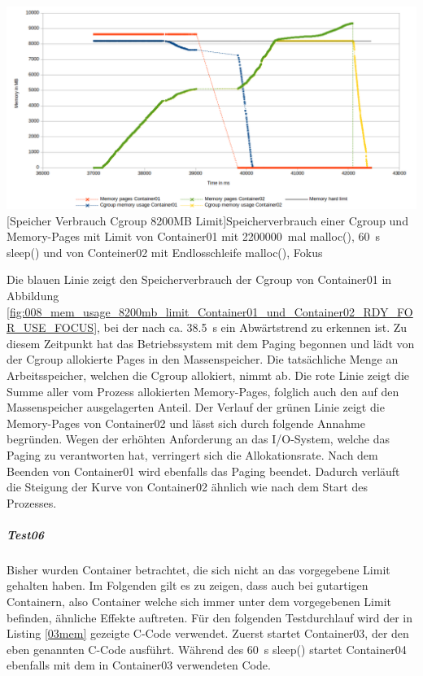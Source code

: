 \vspace{1em}
\begin{minipage}{\linewidth}
	\centering
	\includegraphics[width=1\linewidth]{pics/008_mem_usage_8200mb_limit_Container01_und_Container02_RDY_FOR_USE_FOCUS.png}
	[Speicher Verbrauch Cgroup 8200MB Limit]{Speicherverbrauch einer Cgroup und Memory-Pages mit Limit von Container01 mit \SI{2200000}{mal} malloc(), \SI{60}{\second} sleep() und von Conteiner02 mit Endlosschleife malloc(), Fokus}
	\label{fig:008_mem_usage_8200mb_limit_Container01_und_Container02_RDY_FOR_USE_FOCUS}
\end{minipage}



Die blauen Linie zeigt den Speicherverbrauch der Cgroup von Container01 in Abbildung \ref{fig:008_mem_usage_8200mb_limit_Container01_und_Container02_RDY_FOR_USE_FOCUS}, bei der nach ca. \SI{38,5}{\second} ein Abwärtstrend zu erkennen ist. Zu diesem Zeitpunkt hat das Betriebssystem mit dem Paging begonnen und lädt von der Cgroup allokierte Pages in den Massenspeicher. Die tatsächliche Menge an Arbeitsspeicher, welchen die Cgroup allokiert, nimmt ab. Die rote Linie zeigt die Summe aller vom Prozess allokierten Memory-Pages, folglich auch den auf den Massenspeicher ausgelagerten Anteil. Der Verlauf der grünen Linie zeigt die Memory-Pages von Container02 und lässt sich durch folgende Annahme begründen. Wegen der erhöhten Anforderung an das I/O-System, welche das Paging zu verantworten hat, verringert sich die Allokationsrate. Nach dem Beenden von Container01 wird ebenfalls das Paging beendet. Dadurch verläuft die Steigung der Kurve von Container02 ähnlich wie nach dem Start des Prozesses. 

\subparagraph{Test06}
Bisher wurden Container betrachtet, die sich nicht an das vorgegebene Limit gehalten haben. Im Folgenden gilt es zu zeigen, dass auch bei \glqq gutartigen\grqq{}  Containern, also Container welche sich immer unter dem vorgegebenen Limit befinden, ähnliche Effekte auftreten. Für den folgenden Testdurchlauf wird der in Listing \ref{03mem} gezeigte C-Code verwendet. Zuerst startet Container03, der den eben genannten C-Code ausführt. Während des \SI{60}{\second} sleep() startet Container04 ebenfalls mit dem in Container03 verwendeten Code.

